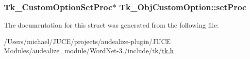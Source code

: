 \subsubsection[{\texorpdfstring{set\+Proc}{setProc}}]{\setlength{\rightskip}{0pt plus 5cm}Tk\+\_\+\+Custom\+Option\+Set\+Proc$\ast$ Tk\+\_\+\+Obj\+Custom\+Option\+::set\+Proc}\hypertarget{struct_tk___obj_custom_option_a0b8c5efcf6191f3ff9d1b0da30a35a9e}{}\label{struct_tk___obj_custom_option_a0b8c5efcf6191f3ff9d1b0da30a35a9e}


The documentation for this struct was generated from the following file\+:\begin{DoxyCompactItemize}
\item 
/\+Users/michael/\+J\+U\+C\+E/projects/audealize-\/plugin/\+J\+U\+C\+E Modules/audealize\+\_\+module/\+Word\+Net-\/3./include/tk/\hyperlink{tk_8h}{tk.\+h}\end{DoxyCompactItemize}
